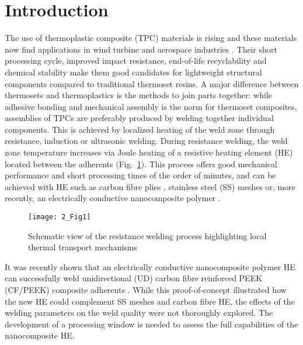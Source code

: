 \section{Introduction}

The use of thermoplastic composite (TPC) materials is rising \cite{Mathijsen2016} and these materials now find applications in wind turbine and aerospace industries \cite{Penumadu2019}. 
Their short processing cycle, improved impact resistance, end-of-life recyclability and chemical stability \cite{cogswell1992} make them good candidates for lightweight structural components compared to traditional thermoset resins. 
A major difference between thermosets and thermoplastics is the methods to join parts together: while adhesive bonding and mechanical assembly is the norm for thermoset composites, assemblies of TPCs are preferably produced by welding together individual components. 
This is achieved by localized heating of the weld zone through resistance, induction or ultrasonic welding. 
During resistance welding, the weld zone temperature increases via Joule heating of a resistive heating element (HE) located between the adherents \cite{Ageorges2001a,Stavrov2005a,Dube2007c,Shi2014,Brassard2019a,Eveno1988} (Fig.~\ref{fig:2_Fig1}). 
This process offers good mechanical performance and short processing times of the order of minutes, and can be achieved with HE such as carbon fibre plies \cite{Eveno1988}, stainless steel (SS) meshes \cite{Stavrov2005a,Dube2007c,Shi2014} or, more recently, an electrically conductive nanocomposite polymer \cite{Brassard2019a}. 

\begin{figure}[ht]
	\centering
	\texttt{[image: 2\_Fig1]}
	\caption{Schematic view of the resistance welding process highlighting local thermal transport mechanisms \cite{Brassard2019b}}
	\label{fig:2_Fig1}
\end{figure} 

It was recently shown that an electrically conductive nanocomposite polymer HE can successfully weld unidirectional (UD) carbon fibre reinforced PEEK (CF/PEEK) composite adherents \cite{Brassard2019a}. 
While this proof-of-concept illustrated how the new HE could complement SS meshes and carbon fibre HE, the effects of the welding parameters on the weld quality were not thoroughly explored. 
The development of a processing window is needed to assess the full capabilities of the nanocomposite HE. 

